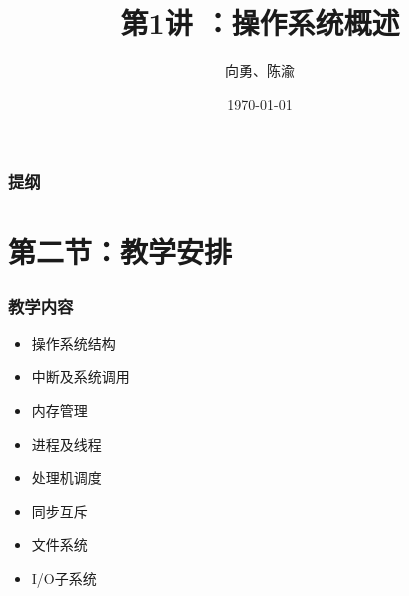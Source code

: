 \documentclass[UTF8]{ctexbeamer}
\title[第1讲]{第1讲 ：操作系统概述} %
\author{向勇、陈渝} %
\institute[清华大学] %
{
清华大学计算机系 \\ %
\medskip
\textit{xyong,yuchen@tsinghua.edu.cn} %
}
\date{\today} %
\begin{document}
\begin{frame}
\titlepage %
\end{frame}

\begin{frame}
\frametitle{提纲} %
\tableofcontents %
\end{frame}


\section{第二节：教学安排} %

\begin{frame}
	\frametitle{教学内容}
    \begin{itemize}
		\item 操作系统结构
		\item 中断及系统调用
		\item 内存管理
		\item 进程及线程
		\item 处理机调度
		\item 同步互斥
		\item 文件系统
		\item I/O子系统
    \end{itemize}
\end{frame}

\end{document}
